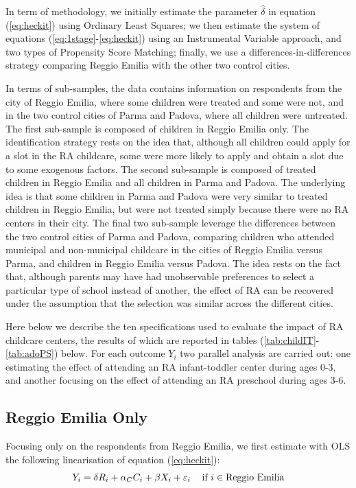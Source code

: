 \documentclass[12pt]{article}
\begin{document}
In term of methodology, we initially estimate the parameter $\hat{\delta}$ in equation (\ref{eq:heckit}) using Ordinary Least Squares; we then estimate the system of equations (\ref{eq:1stage}-\ref{eq:heckit}) using an Instrumental Variable approach, and two types of Propensity Score Matching; finally, we use a differences-in-differences strategy comparing Reggio Emilia with the other two control cities.

In terms of sub-samples, the data contains information on respondents from the city of Reggio Emilia, where some children were treated and some were not, and in the two control cities of Parma and Padova, where all children were untreated. The first sub-sample is composed of children in Reggio Emilia only. The identification strategy rests on the idea that, although all children could apply for a slot in the RA childcare, some were more likely to apply and obtain a slot due to some exogenous factors. The second sub-sample is composed of treated children in Reggio Emilia and all children in Parma and Padova. The underlying idea is that some children in Parma and Padova were very similar to treated children in Reggio Emilia, but were not treated simply because there were no RA centers in their city. The final two sub-sample leverage the differences between the two control cities of Parma and Padova, comparing children who attended municipal and non-municipal childcare in the cities of Reggio Emilia versus Parma, and children in Reggio Emilia versus Padova. The idea rests on the fact that, although parents may have had unobservable preferences to select a particular type of school instead of another, the effect of RA can be recovered under the assumption that the selection was similar across the different cities.

Here below we describe the ten specifications used to evaluate the impact of RA childcare centers, the results of which are reported in tables (\ref{tab:childIT}-\ref{tab:adoPS}) below. For each outcome $Y_{i}$ two parallel analysis are carried out: one estimating the effect of attending an RA infant-toddler center during ages 0-3, and another focusing on the effect of attending an RA preschool during ages 3-6.

\subsection{Reggio Emilia Only}

Focusing only on the respondents from Reggio Emilia, we first estimate with OLS the following linearisation of equation (\ref{eq:heckit}):
\begin{equation}
Y_{i} = \delta R_{i} + \alpha_{C} C_{i} + \beta X_{i} + \varepsilon_{i}    \hspace{2ex} \text{ if } i \in \text{Reggio Emilia} \label{eq1:OLSreggio}
\end{equation}
\end{document}
